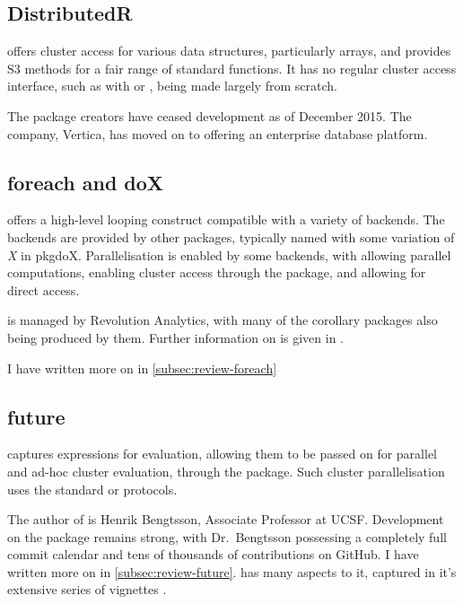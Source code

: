 \subsection{DistributedR}\label{subsec:distributedr}

 offers cluster access for various \R data structures,
particularly arrays, and provides S3 methods for a fair range of
standard functions. It has no regular cluster access interface, such as
with  or , being made largely from scratch.

The package creators have ceased development as of December 2015. The
company, Vertica, has moved on to offering an enterprise database
platform\cite{vertica:_distr}.

\subsection{foreach and doX}\label{subsec:foreach-doc}

 offers a high-level looping construct compatible with a variety
of backends\cite{microsoft20}. The backends are provided by other
packages, typically named with some variation of \emph{X} in pkg{doX}.
Parallelisation is enabled by some backends, with  allowing
parallel computations\cite{corporation19},  enabling cluster
access through the  package\cite{dosnow19}, and  allowing for
direct  access\cite{weston17}.

 is managed by Revolution Analytics, with many of the 
corollary packages also being produced by them. Further information on
 is given in \cite{weston19:_using}.

I have written more on  in \cref{subsec:review-foreach}

\subsection{future}\label{subsec:future-furrr}

 captures \R expressions for evaluation, allowing them to be passed
on for parallel and ad-hoc cluster evaluation, through the 
package\cite{bengtsson20}. Such cluster parallelisation uses the standard  or
 protocols.

The author of  is Henrik Bengtsson, Associate Professor at UCSF.
Development on the package remains strong, with Dr.~Bengtsson possessing
a completely full commit calendar and tens of thousands of contributions on GitHub. I
have written more on  in \cref{subsec:review-future}.  has many aspects to it, captured in it's
extensive series of vignettes\cites{bengtsson20:future-r,bengtsson20:future-r2}
\cites{bengtsson20:future-r3,bengtsson20:future-r4,bengtsson20:future-r5,bengtsson20:future-r6}.


